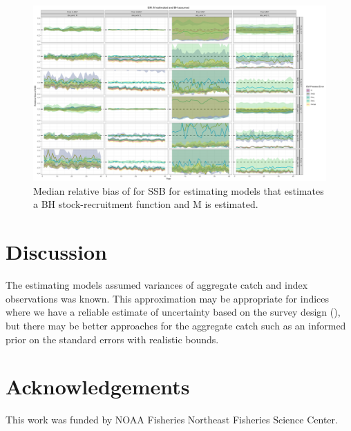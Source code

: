 \documentclass[
  12pt,
]{article}
\newlength{\cslhangindent}
\newlength{\cslentryspacingunit} %
\newenvironment{CSLReferences}[2] %
 {%
  \setlength{\parindent}{0pt}
  \ifodd #1
  \let\oldpar\par
  \def\par{\hangindent=\cslhangindent\oldpar}
  \fi
  \setlength{\parskip}{#2\cslentryspacingunit}
 }%
 {}
\begin{document}
\begin{landscape}
\begin{figure}
\caption{Median relative bias of for SSB for estimating models that estimates a BH stock-recruitment function and M is estimated.}\label{naa_om_em_SR_ME_relbias_ssb}
\begin{center}
\includegraphics[width = \textwidth]{naa_om_SR_ME_relbias_ssb.png}
\end{center}
\end{figure}
\end{landscape}

\hypertarget{discussion}{%
\section{Discussion}\label{discussion}}

The estimating models assumed variances of aggregate catch and index
observations was known. This approximation may be appropriate for
indices where we have a reliable estimate of uncertainty based on the
survey design (), but there may be better approaches for the aggregate
catch such as an informed prior on the standard errors with realistic
bounds.

\hypertarget{acknowledgements}{%
\section*{Acknowledgements}\label{acknowledgements}}

This work was funded by NOAA Fisheries Northeast Fisheries Science
Center.

\pagebreak



\hypertarget{refs}{}
\begin{CSLReferences}{0}{0}
\end{CSLReferences}

\pagebreak

\clearpage
\end{document}
